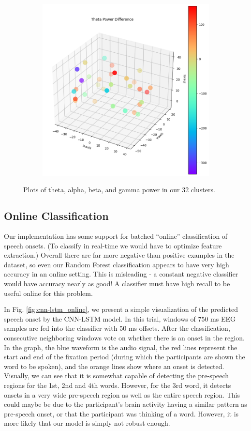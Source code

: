 \documentclass[format=sigconf, nonacm=true, review=false, screen=true]{acmart}
\begin{document}
\begin{figure}[H]
\begin{subfigure}
     \end{subfigure}
     \begin{subfigure}
         \centering
         \includegraphics[width=0.48\columnwidth]{figures/cluster-theta.png}
     \end{subfigure}
    \caption{Plots of theta, alpha, beta, and gamma power in our 32 clusters.}
    \label{fig:cluster_visualization}
\end{figure}

\subsection{Online Classification}

Our implementation has some support for batched ``online'' classification of speech onsets. (To classify in real-time we would have to optimize feature extraction.) Overall there are far more negative than positive examples in the dataset, so even our Random Forest classification appears to have very high accuracy in an online setting. This is misleading - a constant negative classifier would have accuracy nearly as good! A classifier must have high recall to be useful online for this problem.

In Fig. \ref{fig:cnn-lstm_online}, we present a simple visualization of the predicted speech onset by the CNN-LSTM model. In this trial, windows of 750 ms EEG samples are fed into the classifier with 50 ms offsets. After the classification, consecutive neighboring windows vote on whether there is an onset in the region. In the graph, the blue waveform is the audio signal, the red lines represent the start and end of the fixation period (during which the participants are shown the word to be spoken), and the orange lines show where an onset is detected. Visually, we can see that it is somewhat capable of detecting the pre-speech regions for the 1st, 2nd and 4th words. However, for the 3rd word, it detects onsets in a very wide pre-speech region as well as the entire speech region. This could maybe be due to the participant's brain activity having a similar pattern as pre-speech onset, or that the participant was thinking of a word. However, it is more likely that our model is simply not robust enough.
\end{document}
